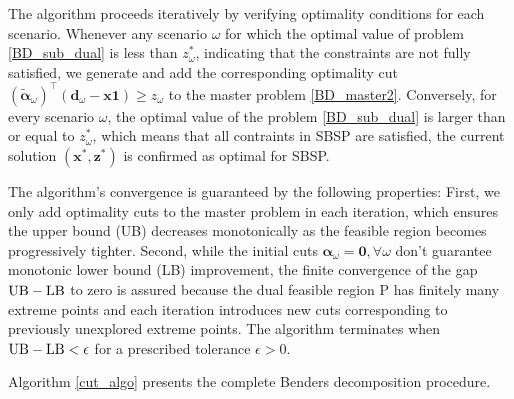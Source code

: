The algorithm proceeds iteratively by verifying optimality conditions for each scenario. Whenever any scenario $\omega$ for which the optimal value of problem \eqref{BD_sub_dual} is less than $z_{\omega}^{*}$, indicating that the constraints are not fully satisfied, we generate and add the corresponding optimality cut $(\bm{\tilde{\alpha}}_{\omega})^{\intercal}(\mathbf{d}_{\omega} - \mathbf{x} \mathbf{1}) \geq z_{\omega}$ to the master problem \eqref{BD_master2}. Conversely, for every scenario $\omega$, the optimal value of the problem \eqref{BD_sub_dual} is larger than or equal to $z_{\omega}^{*}$, which means that all contraints in SBSP are satisfied, the current solution $(\mathbf{x}^{*}, \mathbf{z}^{*})$ is confirmed as optimal for SBSP.

The algorithm's convergence is guaranteed by the following properties: First, we only add optimality cuts to the master problem in each iteration, which ensures the upper bound (UB) decreases monotonically as the feasible region becomes progressively tighter. Second, while the initial cuts $\bm{\alpha}_{\omega} = \mathbf{0}, \forall \omega$ don't guarantee monotonic lower bound (LB) improvement, the finite convergence of the gap $\textup{UB} - \textup{LB}$ to zero is assured because the dual feasible region P has finitely many extreme points and each iteration introduces new cuts corresponding to previously unexplored extreme points. The algorithm terminates when $\textup{UB} - \textup{LB} < \epsilon$ for a prescribed tolerance $\epsilon >0$.







Algorithm \ref{cut_algo} presents the complete Benders decomposition procedure.

